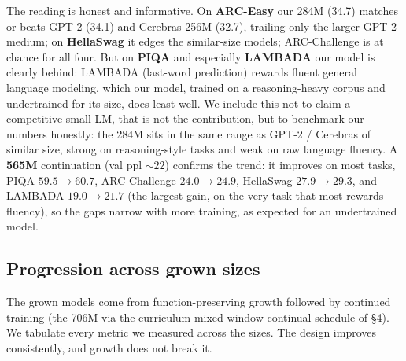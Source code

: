 \documentclass[11pt]{article}
\begin{document}
The reading is honest and informative. On \textbf{ARC-Easy} our 284M (34.7) matches or beats GPT-2 (34.1) and Cerebras-256M (32.7), trailing only the larger GPT-2-medium; on \textbf{HellaSwag} it edges the similar-size models; ARC-Challenge is at chance for all four. But on \textbf{PIQA} and especially \textbf{LAMBADA} our model is clearly behind: LAMBADA (last-word prediction) rewards fluent general language modeling, which our model, trained on a reasoning-heavy corpus and undertrained for its size, does least well. We include this not to claim a competitive small LM, that is not the contribution, but to benchmark our numbers honestly: the 284M sits in the same range as GPT-2 / Cerebras of similar size, strong on reasoning-style tasks and weak on raw language fluency. A \textbf{565M} continuation (val ppl ${\sim}22$) confirms the trend: it improves on most tasks, PIQA $59.5\to60.7$, ARC-Challenge $24.0\to24.9$, HellaSwag $27.9\to29.3$, and LAMBADA $19.0\to21.7$ (the largest gain, on the very task that most rewards fluency), so the gaps narrow with more training, as expected for an undertrained model.

\subsection{Progression across grown sizes}
The grown models come from function-preserving growth followed by continued training (the 706M via the curriculum mixed-window continual schedule of \S4). We tabulate every metric we measured across the sizes. The design improves consistently, and growth does not break it.
\end{document}
